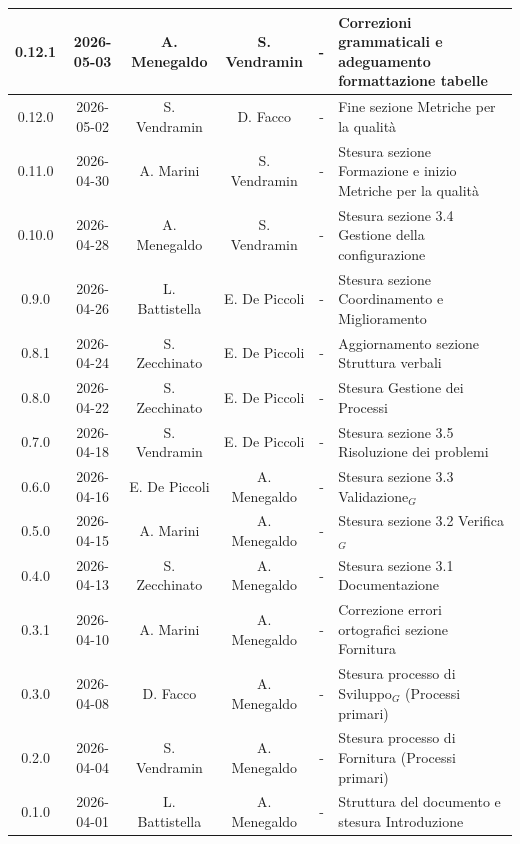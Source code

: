 \documentclass[a4paper, 10pt]{article}
\begin{document}
\begin{longtable}{|c|c|c|c|c|p{3cm}|}
    0.12.1 & 2026-05-03 & A. Menegaldo & S. Vendramin & - & Correzioni grammaticali e adeguamento formattazione tabelle \\ \hline

    0.12.0 & 2026-05-02 & S. Vendramin & D. Facco & - & Fine sezione Metriche per la qualità \\ \hline

    0.11.0 & 2026-04-30 & A. Marini & S. Vendramin & - & Stesura sezione Formazione e inizio Metriche per la qualità \\ \hline

    0.10.0 & 2026-04-28 & A. Menegaldo & S. Vendramin & - & Stesura sezione 3.4 Gestione della configurazione \\ \hline

    0.9.0 & 2026-04-26 & L. Battistella & E. De Piccoli & - & Stesura sezione Coordinamento e Miglioramento \\ \hline

    0.8.1 & 2026-04-24 & S. Zecchinato & E. De Piccoli & - & Aggiornamento sezione Struttura verbali \\ \hline

    0.8.0 & 2026-04-22 & S. Zecchinato & E. De Piccoli & - & Stesura Gestione dei Processi \\ \hline

    0.7.0 & 2026-04-18 & S. Vendramin & E. De Piccoli & - & Stesura sezione 3.5 Risoluzione dei problemi \\ \hline

    0.6.0  & 2026-04-16 & E. De Piccoli & A. Menegaldo & - & Stesura sezione 3.3 Validazione$_G$ \\ \hline

    0.5.0  & 2026-04-15 & A. Marini & A. Menegaldo & - & Stesura sezione 3.2 Verifica$_G$ \\ \hline

    0.4.0  & 2026-04-13 & S. Zecchinato & A. Menegaldo & - & Stesura sezione 3.1 Documentazione \\ \hline

    0.3.1  & 2026-04-10 & A. Marini & A. Menegaldo & - & Correzione errori ortografici sezione Fornitura \\ \hline

    0.3.0  & 2026-04-08 & D. Facco & A. Menegaldo & - & Stesura processo di Sviluppo$_G$ (Processi primari) \\ \hline

    0.2.0  & 2026-04-04 & S. Vendramin & A. Menegaldo & - & Stesura processo di Fornitura (Processi primari) \\ \hline

    0.1.0  & 2026-04-01 & L. Battistella & A. Menegaldo & - & Struttura del documento e stesura Introduzione \\ \hline

\end{longtable}
\endgroup
\end{document}
